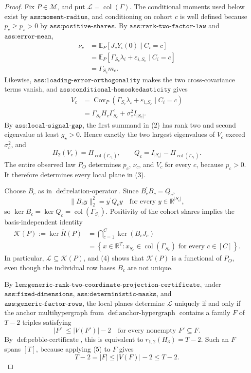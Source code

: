 \documentclass{article}
\begin{document}
\begin{proof}
Fix \(P\in\mathcal M\), and put \(\mathcal L=\operatorname{col}(\Gamma)\). The conditional moments used below exist by \(\texttt{ass:moment-radius}\), and conditioning on cohort \(c\) is well defined because \(p_c\geq p_\star>0\) by \(\texttt{ass:positive-shares}\). By \(\texttt{ass:rank-two-factor-law}\) and \(\texttt{ass:error-mean}\),
\[
\begin{aligned}
\nu_c
&=\mathbb E_P[J_cY_i(0)\mid C_i=c]\\
&=\mathbb E_P[\Gamma_{S_c}\lambda_i+\varepsilon_{i,S_c}\mid C_i=c]\\
&=\Gamma_{S_c}m_c.
\end{aligned}
\tag{1}
\]
Likewise, \(\texttt{ass:loading-error-orthogonality}\) makes the two cross-covariance terms vanish, and \(\texttt{ass:conditional-homoskedasticity}\) gives
\[
\begin{aligned}
V_c
&=\operatorname{Cov}_P(\Gamma_{S_c}\lambda_i+\varepsilon_{i,S_c}\mid C_i=c)\\
&=\Gamma_{S_c}H_c\Gamma_{S_c}^{\prime}+\sigma_c^2I_{|S_c|}.
\end{aligned}
\tag{2}
\]
By \(\texttt{ass:local-signal-gap}\), the first summand in (2) has rank two and second eigenvalue at least \(g_\star>0\). Hence exactly the two largest eigenvalues of \(V_c\) exceed \(\sigma_c^2\), and
\[
\Pi_2(V_c)=\Pi_{\operatorname{col}(\Gamma_{S_c})},
\qquad
Q_c=I_{|S_c|}-\Pi_{\operatorname{col}(\Gamma_{S_c})}.
\tag{3}
\]
The entire observed law \(P_O\) determines \(p_c\), \(\nu_c\), and \(V_c\) for every \(c\), because \(p_c>0\). It therefore determines every local plane in (3).

Choose \(B_c\) as in \(\operatorname{def:relation\text{-}operator}\). Since \(B_c^{\prime}B_c=Q_c\),
\[
\|B_cy\|_2^2=y^{\prime}Q_cy
\quad\text{for every }y\in\mathbb R^{|S_c|},
\]
so \(\ker B_c=\ker Q_c=\operatorname{col}(\Gamma_{S_c})\). Positivity of the cohort shares implies the basis-independent identity
\[
\begin{aligned}
\mathcal K(P):=\ker\overline R(P)
&=\bigcap_{c=1}^C\ker(B_cJ_c)\\
&=\left\{x\in\mathbb R^T:x_{S_c}\in
\operatorname{col}(\Gamma_{S_c})\text{ for every }c\in[C]\right\}.
\end{aligned}
\tag{4}
\]
In particular, \(\mathcal L\subseteq\mathcal K(P)\), and (4) shows that \(\mathcal K(P)\) is a functional of \(P_O\), even though the individual row bases \(B_c\) are not unique.

By \(\texttt{lem:generic-rank-two-coordinate-projection-certificate}\), under \(\texttt{ass:fixed-dimensions}\), \(\texttt{ass:deterministic-masks}\), and \(\texttt{ass:generic-factor-rows}\), the local planes determine \(\mathcal L\) uniquely if and only if the anchor multihypergraph from \(\operatorname{def:anchor\text{-}hypergraph}\) contains a family \(F\) of \(T-2\) triples satisfying
\[
|F'|\leq |V(F')|-2
\quad\text{for every nonempty }F'\subseteq F.
\tag{5}
\]
By \(\operatorname{def:pebble\text{-}certificate}\), this is equivalent to \(r_{1,2}(H_3)=T-2\). Such an \(F\) spans \([T]\), because applying (5) to \(F\) gives
\[
T-2=|F|\leq |V(F)|-2\leq T-2.
\]


\end{proof}
\end{document}

